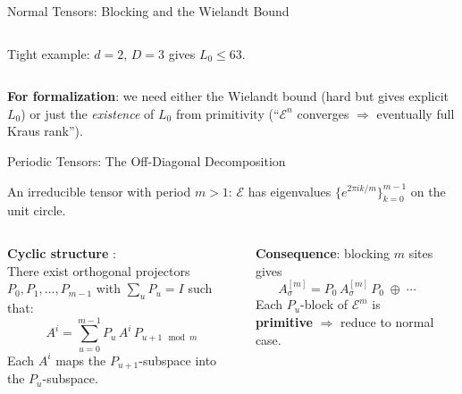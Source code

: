 \documentclass[aspectratio=169,10pt]{beamer}
\begin{document}
\begin{frame}{Normal Tensors: Blocking and the Wielandt Bound}
\begin{columns}[T]
        {\footnotesize\textcolor{dimwhite}{Tight example:
        $d=2$, $D=3$ gives $L_0 \leq 63$.}}
    \end{columns}

    \vspace{0.4em}
    {\footnotesize\textcolor{dimwhite}{%
    \textbf{For formalization}: we need either the Wielandt bound (hard but gives explicit $L_0$)
    or just the \emph{existence} of $L_0$ from primitivity
    (``$\mathcal{E}^n$ converges $\Rightarrow$ eventually full Kraus rank'').}}
\end{frame}

\begin{frame}{Periodic Tensors: The Off-Diagonal Decomposition}
    \vspace{-0.7em}

    {\small An irreducible tensor with period $m > 1$: $\mathcal{E}$ has
    eigenvalues $\{e^{2\pi i k/m}\}_{k=0}^{m-1}$ on the unit circle.}

    \vspace{0.2em}
    \begin{columns}[T]
        \textbf{Cyclic structure} \cite{Wolf2012Quantum,Cirac2021Matrix}:\\[2pt]
        {\small There exist orthogonal projectors $P_0, P_1, \ldots, P_{m-1}$
        with $\sum_u P_u = I$ such that:}
        \vspace{-0.3em}
        \[
            A^i = \sum_{u=0}^{m-1} P_u\, A^i\, P_{u+1\!\!\mod m}
        \]
        \vspace{-0.5em}
        {\small Each $A^i$ maps the $P_{u+1}$-subspace into the $P_u$-subspace.}

        \vspace{0.2em}
        \textbf{Consequence}: blocking $m$ sites gives
        \vspace{-0.3em}
        \[
            A^{[m]}_\sigma = P_0\, A^{[m]}_\sigma\, P_0 \;\oplus\; \cdots
        \]
        \vspace{-0.5em}
        {\small Each $P_u$-block of $\mathcal{E}^m$ is \textbf{primitive}
        $\Rightarrow$ reduce to normal case.}

        \begin{center}
\end{center}
\end{columns}
\end{frame}
\end{document}
